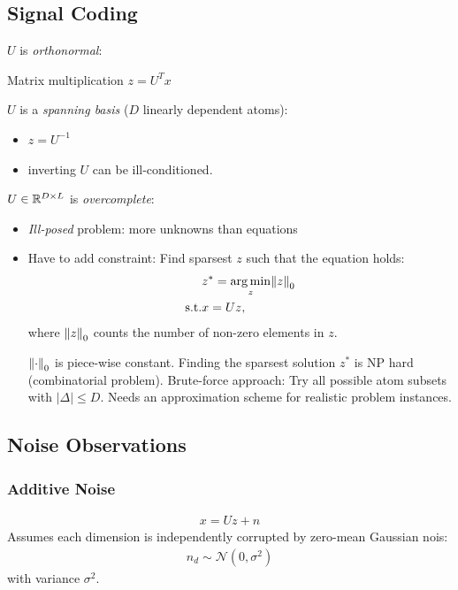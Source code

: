 \subsection{Signal Coding}
\begin{description}
\item $U$ is \emph{orthonormal}:

    Matrix multiplication $z=U^T x$
\item $U$ is a \emph{spanning basis} ($D$ linearly dependent atoms):

    \begin{itemize}
        \item $z = U^{-1}$
        \item inverting $U$ can be ill-conditioned.
    \end{itemize}
\item $U \in \mathbb{R}^{D\times L}$ is \emph{overcomplete}:
    \begin{itemize}
        \item \emph{Ill-posed} problem: more unknowns than equations
        \item Have to add constraint: Find sparsest $z$ such that the equation holds:
            \begin{align*}
                 &z^* = \argmin_{z} \norm{z}_0\\
                 \text{s.t.}& x= Uz,
            \end{align*}
            where $\left\lVert z\right\rVert_0$ counts the number of non-zero elements in $z$.
            
            \subitem $\left\lVert\cdot\right\rVert_0$ is piece-wise constant.
            \subitem Finding the sparsest solution $z^*$ is NP hard (combinatorial problem).
            \subitem Brute-force approach: Try all possible atom subsets with $|\Delta| \leq D$.
            \subitem Needs an approximation scheme for realistic problem instances.
    \end{itemize}
\end{description}

\subsection{Noise Observations}
\subsubsection{Additive Noise}
\begin{align*}
     x = Uz + n
\end{align*}
Assumes each dimension is independently corrupted by zero-mean Gaussian nois:
    \begin{align*}
        n_d  \sim \mathcal N(0,\sigma^2)
    \end{align*}
    with variance $\sigma^2$.
    
